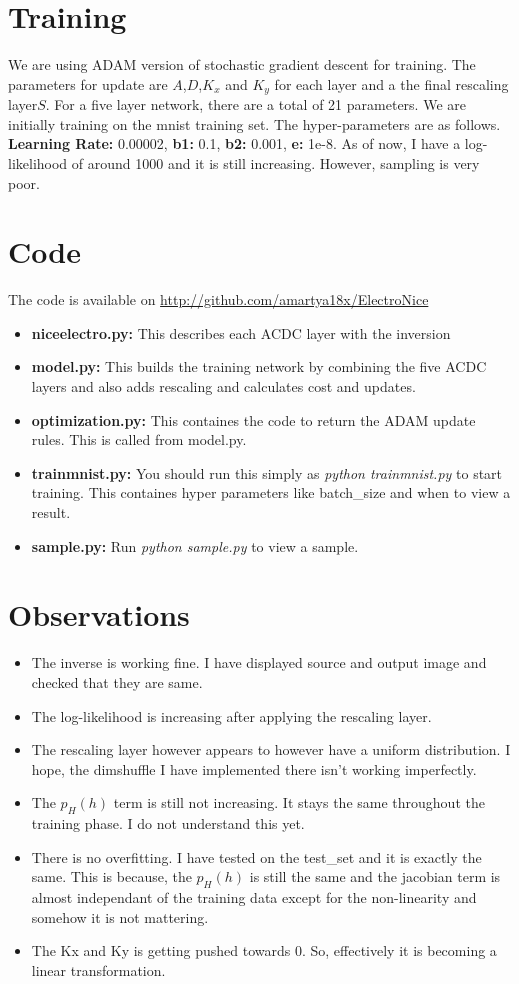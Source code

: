 \documentclass{article}
\begin{document}
\section{Training}
We are using ADAM version of stochastic gradient descent for training. The parameters for update are $A$,$D$,$K_x$ and $K_y$ for each layer and a the final rescaling layer$S$. For a five layer network, there are a total of 21 parameters. We are initially training on the mnist training set. The hyper-parameters are as follows.
\textbf{Learning Rate: }0.00002, \textbf{b1: }0.1, \textbf{b2: }0.001, \textbf{e: }1e-8.
As of now, I have a log-likelihood of around 1000 and it is still increasing. However, sampling is very poor.
\section{Code}
The code is available on \url{http://github.com/amartya18x/ElectroNice}
\begin{itemize}
\item  \textbf{niceelectro.py:} This describes each ACDC layer with the inversion
\item \textbf{model.py:} This builds the training network by combining the five ACDC layers and also adds rescaling and calculates cost and updates.
\item \textbf{optimization.py:} This containes the code to return the ADAM update rules. This is called from model.py.
\item \textbf{trainmnist.py:} You should run this simply as \textit{python trainmnist.py} to start training. This containes hyper parameters like batch\_size and when to view a result.
\item \textbf{sample.py:} Run \textit{python sample.py} to view a sample.
\end{itemize}
\section{Observations}
\begin{itemize}
\item The inverse is working fine. I have displayed source and output image and checked that they are same.
\item The log-likelihood is increasing after applying the rescaling layer.
\item The rescaling layer however appears to however have a uniform distribution. I hope, the dimshuffle I have implemented there isn't working imperfectly.
\item The $p_H(h)$ term is still not increasing. It stays the same throughout the training phase. I do not understand this yet.
\item There is no overfitting. I have tested on the test\_set and it is exactly the same. This is because, the $p_H(h)$ is still the same and the jacobian term is almost independant of the training data except for the non-linearity and somehow it is not mattering.
\item The Kx and Ky is getting pushed towards 0. So, effectively it is becoming a linear transformation.
\end{itemize}
\end{document}
